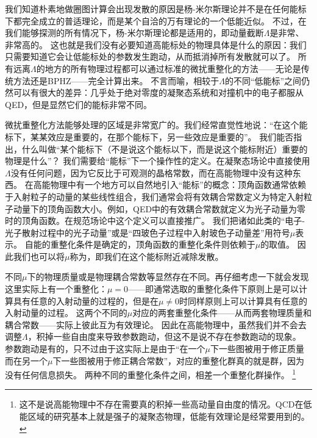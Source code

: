 我们知道朴素地做圈图计算会出现发散的原因是杨-米尔斯理论并不是在任何能标下都完全成立的普适理论，而是某个自洽的万有理论的一个低能近似。
不过，在我们能够探测的所有情况下，杨-米尔斯理论都是适用的，即动量截断$\Lambda$是非常、非常高的。
这也就是我们没有必要知道高能标处的物理具体是什么的原因：我们只需要知道它会让低能标处的参数发生跑动，从而抵消掉所有发散就可以了。
所有远离$\Lambda$的地方的所有物理过程都可以通过标准的微扰重整化的方法——无论是传统方法还是BPHZ——完全计算出来。
不言而喻，相较于$\Lambda$的不同“低能标”之间仍然可以有很大的差异：几乎处于绝对零度的凝聚态系统和对撞机中的电子都服从QED，但是显然它们的能标非常不同。

微扰重整化方法能够处理的区域是非常宽广的。我们经常直觉性地说：“在这个能标下，某某效应是重要的，在那个能标下，另一些效应是重要的”。
我们能否指出，什么叫做“某个能标下（不是说这个能标以下，而是说这个能标附近）重要的物理是什么”？
我们需要给“能标”下一个操作性的定义。在凝聚态场论中直接使用$\Lambda$没有任何问题，因为它反比于可观测的晶格常数，而在高能物理中没有这种东西。
在高能物理中有一个地方可以自然地引入“能标”的概念：顶角函数通常依赖于入射粒子的动量的某些线性组合，我们通常会将有效耦合常数定义为特定入射粒子动量下的顶角函数大小。例如，QED中的有效耦合常数就定义为光子动量为零时的顶角函数。在规范场论中这个定义可以直接推广。
我们把诸如此类的“电子-光子散射过程中的光子动量”或是“四玻色子过程中入射玻色子动量差”用符号$\mu$表示。
自能的重整化条件是确定的，顶角函数的重整化条件则依赖于$\mu$的取值。
因此我们也可以将$\mu$称为，即我们在这个能标附近减除发散。

不同$\mu$下的物理质量或是物理耦合常数等显然存在不同。再仔细考虑一下就会发现这里实际上有一个重整化：$\mu=0$——即通常选取的重整化条件下原则上是可以计算具有任意的入射动量的过程的，但是在$\mu \neq 0$时同样原则上可以计算具有任意的入射动量的过程。
这两个不同的$\mu$对应的两套重整化条件——从而两套物理质量和耦合常数——实际上彼此互为有效理论。
因此在高能物理中，虽然我们并不会去调整$\Lambda$，积掉一些自由度来导致参数跑动，但这不是说不存在参数跑动的现象。
参数跑动是有的，只不过由于这实际上是由于“在一个$\mu$下一些图被用于修正质量而在另一个$\mu$下一些图被用于修正耦合常数”，对应的重整化群真的就是群，因为没有任何信息损失。
两种不同的重整化条件之间，相差一个重整化群操作。%
\footnote{
    这不是说高能物理中不存在需要真的积掉一些高动量自由度的情况。QCD在低能区域的研究基本上就是强子的凝聚态物理，低能有效理论是经常要用到的。
}%

